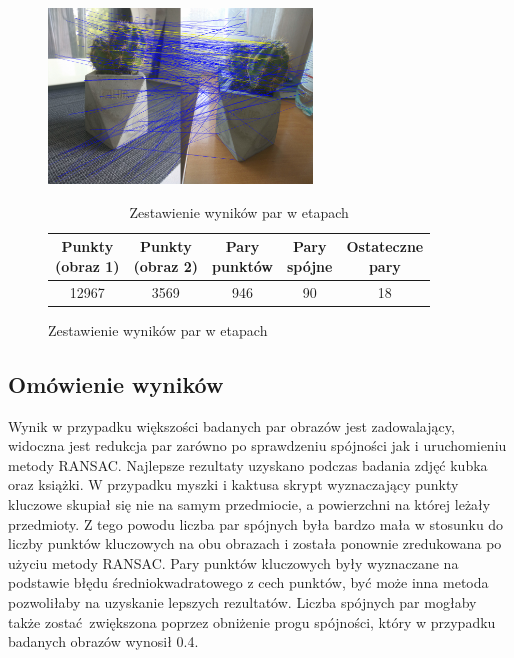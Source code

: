 \documentclass[../main.tex]{subfiles}
\begin{document}
    \begin{figure}[H]
    \centering
    \begin{minipage}{.5\textwidth}
        \caption{Wynik metody RANSAC}
        \centering
        \includegraphics[width=7cm]{cactus_pairs_ranscons_out}
    \end{minipage}%
    \begin{minipage}{.5\textwidth}
        \begin{table}[H]
        \caption{Zestawienie wyników par w etapach}
        \label{t:cactus}
        \begin{center}
        \begin{tabular}{|c|c|c|c|c|} 
        \hline
        \thead{Punkty \\ (obraz 1)} & \thead{Punkty \\ (obraz 2)} & \thead{Pary \\ punktów} & \thead{Pary \\ spójne} &
        \thead{Ostateczne \\ pary} \\
        \hline
        {12967} & {3569} & {946} & {90} & {18} \\
        \hline
        \end{tabular}
        \end{center}
        \end{table}
    \end{minipage}%
    \end{figure}
    
    \justify
    \subsection{Omówienie wyników}
    Wynik w przypadku większości badanych par obrazów jest zadowalający, widoczna jest redukcja par zarówno po sprawdzeniu spójności jak i uruchomieniu metody RANSAC. Najlepsze rezultaty uzyskano podczas badania zdjęć kubka oraz książki. W przypadku myszki i kaktusa skrypt wyznaczający punkty kluczowe skupiał się nie na samym przedmiocie, a powierzchni na której leżały przedmioty. Z tego powodu liczba par spójnych była bardzo mała w stosunku do liczby punktów kluczowych na obu obrazach i została ponownie zredukowana po użyciu metody RANSAC. Pary punktów kluczowych były wyznaczane na podstawie błędu średniokwadratowego z cech punktów, być może inna metoda pozwoliłaby na uzyskanie lepszych rezultatów. Liczba spójnych par mogłaby także zostać zwiększona poprzez obniżenie progu spójności, który w przypadku badanych obrazów wynosił 0.4.
 
\end{document}
